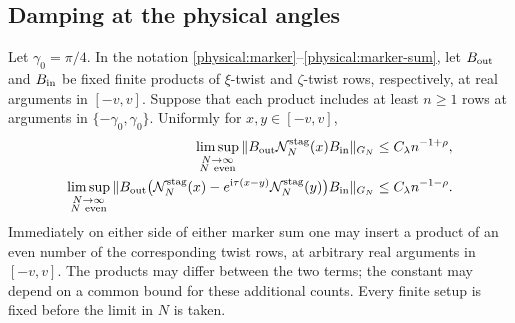 \subsection{Damping at the physical angles}
\label{physical:physical-damping}

\begin{proposition}
\label{physical:staggered-transfer}
\label{physical:finite-staggered}
Let $\gamma_0=\pi/4$. In the notation
\eqref{physical:marker}--\eqref{physical:marker-sum}, let $B_{\rm out}$
and $B_{\rm in}$ be fixed finite products of $\xi$-twist and
$\zeta$-twist rows, respectively, at real arguments in $[-v,v]$.
Suppose that each product includes at least $n\ge1$ rows at arguments
in $\{-\gamma_0,\gamma_0\}$. Uniformly for $x,y\in[-v,v]$,
\begin{align}
 \limsup_{\substack{N\to\infty\\N\ \mathrm{even}}}
 \|B_{\rm out}\mathcal N_N^{\mathrm{stag}}(x)B_{\rm in}\|_{G_N}
       &\le C_\lambda n^{-1+\rho},\label{physical:staggered-low}\\
 \limsup_{\substack{N\to\infty\\N\ \mathrm{even}}}
 \|B_{\rm out}\bigl(\mathcal N_N^{\mathrm{stag}}(x)
       -e^{\mathrm i\tau(x-y)}\mathcal N_N^{\mathrm{stag}}(y)\bigr)
       B_{\rm in}\|_{G_N}
       &\le C_\lambda n^{-1-\rho}.
       \label{physical:staggered-high}
\end{align}
Immediately on either side of either marker sum one may insert a product
of an even number of the corresponding twist rows, at arbitrary real
arguments in $[-v,v]$. The products may differ between the two terms;
the constant may depend on a common bound for these additional counts.
Every finite setup is fixed before the limit in $N$ is taken.
\end{proposition}

